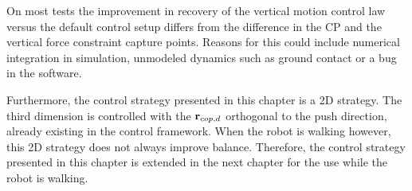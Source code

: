 On most tests the improvement in recovery of the vertical motion control law versus the default control setup differs  from the difference in the \ac{CP} and the vertical force constraint capture points. Reasons for this could include numerical integration in simulation, unmodeled dynamics such as ground contact or a bug in the software.

Furthermore, the control strategy presented in this chapter is a \ac{2D} strategy. The third dimension is controlled with the $\mathbf{r}_{cop,d}$ orthogonal to the push direction, already existing in the control framework. When the robot is walking however, this \ac{2D} strategy does not always improve balance. Therefore, the control strategy presented in this chapter is extended in the next chapter for the use while the robot is walking.



